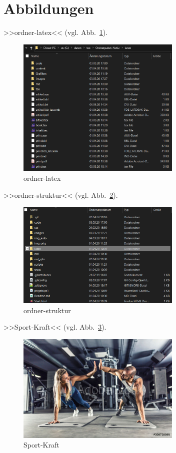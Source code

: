 \section{Abbildungen}\label{abbildungen} 

>>ordner-latex<< (vgl. Abb.~\ref{fig:ordner-latex}).%
\begin{figure}[H]%
  \centering
  \includegraphics[width=0.7\textwidth]{images/ordner-latex}
  \caption{ordner-latex}%
  \label{fig:ordner-latex}%
\end{figure}
  

>>ordner-struktur<< (vgl. Abb.~\ref{fig:ordner-struktur}).%
\begin{figure}[H]%
  \centering
  \includegraphics[width=0.7\textwidth]{images/ordner-struktur}
  \caption{ordner-struktur}%
  \label{fig:ordner-struktur}%
\end{figure}
  

>>Sport-Kraft<< (vgl. Abb.~\ref{fig:Sport-Kraft}).%
\begin{figure}[H]%
  \centering
  \includegraphics[width=0.7\textwidth]{images/Sport-Kraft}
  \caption{Sport-Kraft}%
  \label{fig:Sport-Kraft}%
\end{figure}
  

